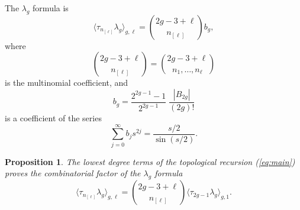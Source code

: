 \documentclass{amsart}
\newtheorem{prop}[thm]{Proposition}
\theoremstyle{definition}
\numberwithin{equation}{section}
\numberwithin{figure}{section}
\newcommand{\la}{{\langle}}
\newcommand{\ra}{{\rangle}}
\begin{document}
The $\lambda_g$ formula \cite{FP1, FP2} is
\begin{equation}
\label{eq:lam-g}
\la \tau_{n_{[\ell]}}\lambda_g\ra_{g,\ell}
=\binom{2g-3+\ell}{n_{[\ell]}}b_g,
\end{equation}
where 
\begin{equation}
\label{eq:multinomial}
\binom{2g-3+\ell}{n_{[\ell]}}=
\binom{2g-3+\ell}{n_1,\dots,n_\ell}
\end{equation}
is the multinomial coefficient, and 
$$
b_g = \frac{2^{2g-1}-1}{2^{2g-1}}\;
\frac{|B_{2g}|}{(2g)!}
$$
is a coefficient of the series
$$
\sum_{j=0} ^\infty b_j s^{2j}
= \frac{s/2}{\sin(s/2)}.
$$






\begin{prop}
\label{prop:lam-g}
The lowest degree terms of the topological recursion {\rm{(\ref{eq:main})}}
proves the combinatorial factor of the
$\lambda_g$ formula
\begin{equation}
\label{eq:lam-g-combinatorial}
\la \tau_{n_{[\ell]}}\lambda_g\ra_{g,\ell}
=\binom{2g-3+\ell}{n_{[\ell]}}
\la \tau_{2g-1}\lambda_g\ra_{g,1}.
\end{equation}

\end{prop}
\end{document}
